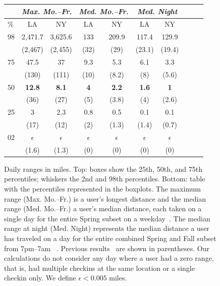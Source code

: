 \begin{figure}[t]
	{\small
\begin{tabular}{| l | c | c | c | c | c | c | c | c | c |}
\hline
           & \multicolumn{2}{c|}{\textit{Max. Mo.--Fr.}} & \multicolumn{2}{c|}{\textit{Med. Mo.--Fr.}} & \multicolumn{2}{c|}{\textit{Med. Night}}  \\ \hline
\%       & LA       & NY       & LA      & NY      & LA      & NY \\ \hline
98       & 2,471.7  & 3,625.6  & 133     & 209.9   & 117.4   & 129.9 \\
         & (2,467)  & (2,455)  & (32)    & (29)    & (23.1)  & (19.4) \\ \hline
75       & 47.5     & 37       & 9.3     & 5.3     & 6.1     & 3.3 \\
         & (130)    & (111)    & (10)    & (8.2)   & (8)     & (5.6) \\ \hline
50       & \textbf{12.8}     & \textbf{8.1}        & \textbf{4}   & \textbf{2.2}   & \textbf{1.6}   & \textbf{1} \\
         & (36)     & (27)     & (5)     & (3.8)   & (4)     & (2.6) \\ \hline
25       & 3        & 2.3      & 0.8     & 0.5     & 0.1     & 0.1 \\
         & (17)     & (12)     & (2)     & (1.3)   & (1.4)   & (0.7)\\ \hline
02       & $\epsilon$ & $\epsilon$ & $\epsilon$& $\epsilon$& $\epsilon$& $\epsilon$ \\
         & (1.6)    & (1.3)    & (0)   & (0)   & (0)   & (0)\\ \hline
\end{tabular}
}
	\caption{Daily ranges in miles. Top: boxes show the 25th, 50th, and 75th percentiles; whiskers the 2nd and 98th percentiles. Bottom: table with the percentiles represented in the boxplots. The maximum range (Max. Mo.--Fr.) is a user's longest distance and the median range (Med. Mo.--Fr.) a user's median distance, each taken on a single day for the entire Spring subset on a weekday~\protect\cite{Isaacman:2010en}. The median range at night (Med. Night) represents the median distance a user has traveled on a day for the entire combined Spring and Fall subset from 7pm--7am ~\protect\cite{Isaacman:2011cn}. Previous results~\protect\cite{Isaacman:2011cn,Isaacman:2010en} are shown in parentheses. Our calculations do not consider any day where a user had a zero range, that is, had multiple checkins at the same location or a single checkin only. We define $\epsilon<0.005$ miles.}
\label{fig:ranges}
\end{figure}

